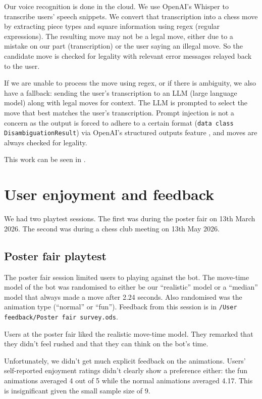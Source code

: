 \documentclass[12pt,titlepage,a4paper]{article}
\begin{document}
    Our voice recognition is done in the cloud. We use OpenAI's Whisper to transcribe users' speech snippets. We convert that transcription into a chess move by extracting piece types and square information using regex (regular expressions). The resulting move may not be a legal move, either due to a mistake on our part (transcription) or the user saying an illegal move. So the candidate move is checked for legality with relevant error messages relayed back to the user.

    If we are unable to process the move using regex, or if there is ambiguity, we also have a fallback: sending the user's transcription to an LLM (large language model) along with legal moves for context. The LLM is prompted to select the move that best matches the user's transcription. Prompt injection is not a concern as the output is forced to adhere to a certain format (\texttt{data class DisambiguationResult}) via OpenAI's structured outputs feature \citep{openai-structured-outputs}, and moves are always checked for legality.

    This work can be seen in .


    \section{User enjoyment and feedback}
    \label{Feedback}

    We had two playtest sessions. The first was during the poster fair on 13th March 2026. The second was during a chess club meeting on 13th May 2026.

    \subsection{Poster fair playtest}

    The poster fair session limited users to playing against the bot. The move-time model of the bot was randomised to either be our ``realistic'' model or a ``median'' model that always made a move after 2.24 seconds. Also randomised was the animation type (``normal'' or ``fun''). Feedback from this session is in \texttt{/User feedback/Poster fair survey.ods}.

    Users at the poster fair liked the realistic move-time model. They remarked that they didn't feel rushed and that they can think on the bot's time.

    Unfortunately, we didn't get much explicit feedback on the animations. Users' self-reported enjoyment ratings didn't clearly show a preference either: the fun animations averaged 4 out of 5 while the normal animations averaged 4.17. This is insignificant given the small sample size of 9.
\end{document}
